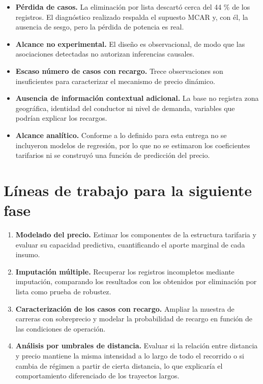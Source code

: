 \documentclass[
]{book}
\providecommand{\tightlist}{%
  \setlength{\itemsep}{0pt}\setlength{\parskip}{0pt}}
\begin{document}
\begin{itemize}
\tightlist
\item
  \textbf{Pérdida de casos.} La eliminación por lista descartó cerca del 44 \% de los registros. El
  diagnóstico realizado respalda el supuesto MCAR y, con él, la ausencia de sesgo, pero la
  pérdida de potencia es real.
\item
  \textbf{Alcance no experimental.} El diseño es observacional, de modo que las asociaciones
  detectadas no autorizan inferencias causales.
\item
  \textbf{Escaso número de casos con recargo.} Trece observaciones son insuficientes para
  caracterizar el mecanismo de precio dinámico.
\item
  \textbf{Ausencia de información contextual adicional.} La base no registra zona geográfica,
  identidad del conductor ni nivel de demanda, variables que podrían explicar los recargos.
\item
  \textbf{Alcance analítico.} Conforme a lo definido para esta entrega no se incluyeron modelos de
  regresión, por lo que no se estimaron los coeficientes tarifarios ni se construyó una función
  de predicción del precio.
\end{itemize}

\section{Líneas de trabajo para la siguiente fase}\label{luxedneas-de-trabajo-para-la-siguiente-fase}

\begin{enumerate}
\def\labelenumi{\arabic{enumi}.}
\tightlist
\item
  \textbf{Modelado del precio.} Estimar los componentes de la estructura tarifaria y evaluar su
  capacidad predictiva, cuantificando el aporte marginal de cada insumo.
\item
  \textbf{Imputación múltiple.} Recuperar los registros incompletos mediante imputación,
  comparando los resultados con los obtenidos por eliminación por lista como prueba de
  robustez.
\item
  \textbf{Caracterización de los casos con recargo.} Ampliar la muestra de carreras con
  sobreprecio y modelar la probabilidad de recargo en función de las condiciones de
  operación.
\item
  \textbf{Análisis por umbrales de distancia.} Evaluar si la relación entre distancia y precio
  mantiene la misma intensidad a lo largo de todo el recorrido o si cambia de régimen a partir
  de cierta distancia, lo que explicaría el comportamiento diferenciado de los trayectos
  largos.
\end{enumerate}
\end{document}
